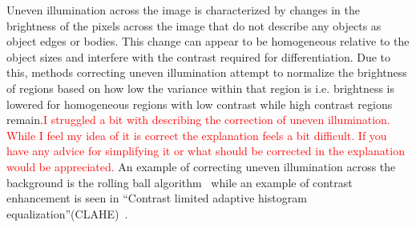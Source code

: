 Uneven illumination across the image is characterized by changes in the brightness of the pixels across the image that do not describe any objects as object edges or bodies. This change can appear to be homogeneous relative to the object sizes and interfere with the contrast required for differentiation. Due to this, methods correcting uneven illumination attempt to normalize the brightness of regions based on how low the variance within that region is i.e. brightness is lowered for homogeneous regions with low contrast while high contrast regions remain.\textcolor{red}{I struggled a bit with describing the correction of uneven illumination. While I feel my idea of it is correct the explanation feels a bit difficult. If you have any advice for simplifying it or what should be corrected in the explanation would be appreciated.} An example of correcting uneven illumination across the background is the rolling ball algorithm~\cite{rolling_ball} while an example of contrast enhancement is seen in ``Contrast limited adaptive histogram equalization''(CLAHE)~\cite{clahe}.

